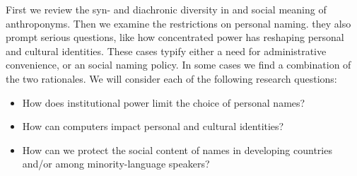 First we review the syn- and diachronic diversity in and social meaning of
anthroponyms. Then we examine the restrictions on personal naming. they also
prompt serious questions, like how concentrated power has reshaping personal and
cultural identities. These cases typify either a need for administrative
convenience, or an social naming policy. In some cases we find a combination of
the two rationales. We will consider each of the following research questions:

\begin{itemize}
\item How does institutional power limit the choice of personal names?
\item How can computers impact personal and cultural identities?
\item How can we protect the social content of names in developing countries
and/or among minority-language speakers?
\end{itemize}
